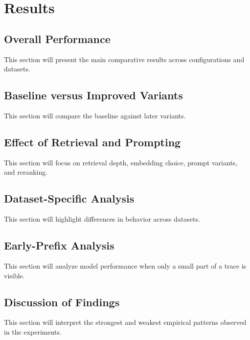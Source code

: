 \chapter{Results}

\section{Overall Performance}
This section will present the main comparative results across configurations and datasets.

\section{Baseline versus Improved Variants}
This section will compare the baseline against later variants.

\section{Effect of Retrieval and Prompting}
This section will focus on retrieval depth, embedding choice, prompt variants, and reranking.

\section{Dataset-Specific Analysis}
This section will highlight differences in behavior across datasets.

\section{Early-Prefix Analysis}
This section will analyze model performance when only a small part of a trace is visible.

\section{Discussion of Findings}
This section will interpret the strongest and weakest empirical patterns observed in the experiments.

\blankpage

